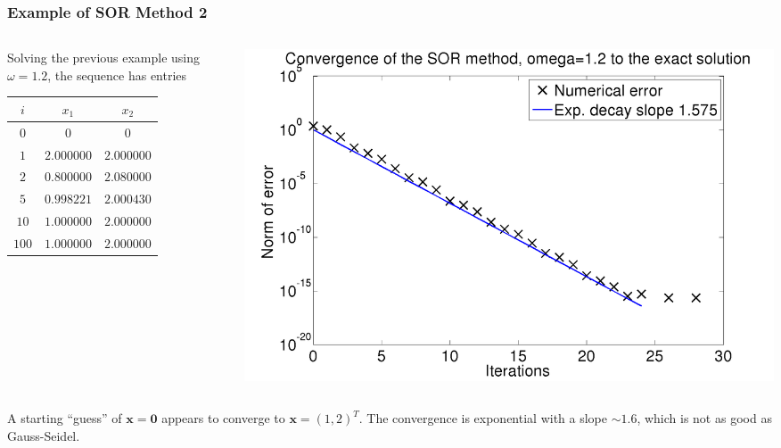 \documentclass{beamer}
\newcommand{\bx}{{\boldsymbol{x}}}
\newcommand{\bfm}[1]{{\boldsymbol{#1}}}
\begin{document}
\begin{frame}
  \frametitle{Example of SOR Method 2}

  \begin{columns}
    \begin{column}{0.475\textwidth}
      Solving the previous example using $\omega = 1.2$, the
      sequence has entries
      \begin{tabular}{|c|c c|}
        $i$ & $x_1$ & $x_2$ \\ \hline
        $0$ & $0$ & $0$ \\
        $1$ & $2.000000$ & $2.000000$ \\
        $2$ & $0.800000$ & $2.080000$ \\
        $5$ & $0.998221$ & $2.000430$ \\
        $10$ & $1.000000$ & $2.000000$ \\
        $100$ & $1.000000$ & $2.000000$
      \end{tabular}
    \end{column}
    \begin{column}{0.525\textwidth}
      \begin{center}
        \includegraphics[width=\textwidth]{figures/SOR2}
      \end{center}
    \end{column}
  \end{columns}

  \vspace{1ex}

  A starting ``guess'' of $\bx = \bfm{0}$ appears to converge to $\bx
  = (1, 2)^T$. The convergence is exponential with a slope $\sim 1.6$,
  which is not as good as Gauss-Seidel.

\end{frame}
\end{document}
